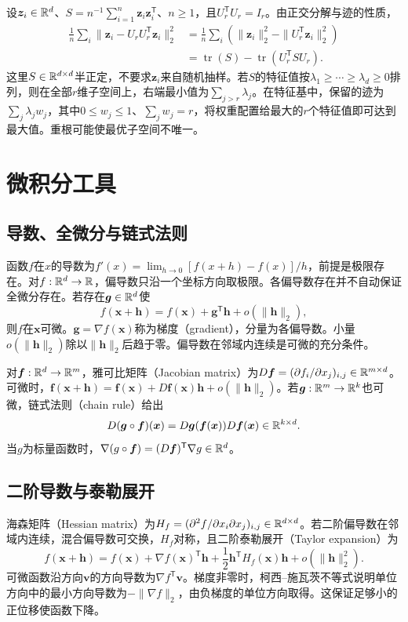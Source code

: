 设$\bm z_i\in\mathbb{R}^d$、$S=n^{-1}\sum_{i=1}^n\bm z_i\bm z_i^{\mathsf T}$、$n\geq1$，且$U_r^{\mathsf T}U_r=I_r$。由正交分解与迹的性质，
\begin{align}
 \frac1n\sum_i\|\bm z_i-U_rU_r^{\mathsf T}\bm z_i\|_2^2
 &=\frac1n\sum_i(\|\bm z_i\|_2^2-\|U_r^{\mathsf T}\bm z_i\|_2^2)\\
 &=\operatorname{tr}(S)-\operatorname{tr}(U_r^{\mathsf T}SU_r).
 \label{eq:math-pca-reconstruction}
\end{align}
这里$S\in\mathbb{R}^{d\times d}$半正定，不要求$\bm z_i$来自随机抽样。若$S$的特征值按$\lambda_1\geq\cdots\geq\lambda_d\geq0$排列，则在全部$r$维子空间上，右端最小值为$\sum_{j>r}\lambda_j$。在特征基中，保留的迹为$\sum_j\lambda_jw_j$，其中$0\leq w_j\leq1$、$\sum_jw_j=r$，将权重配置给最大的$r$个特征值即可达到最大值。重根可能使最优子空间不唯一。

\section{微积分工具}
\subsection{导数、全微分与链式法则}
函数$f$在$x$的导数为$f'(x)=\lim_{h\to0}[f(x+h)-f(x)]/h$，前提是极限存在。对$f:\mathbb{R}^d\to\mathbb{R}$，偏导数只沿一个坐标方向取极限。各偏导数存在并不自动保证全微分存在。若存在$\bm g\in\mathbb{R}^d$使
\begin{equation}
 f(\bm x+\bm h)=f(\bm x)+\bm g^{\mathsf T}\bm h+o(\|\bm h\|_2),
\end{equation}
则$f$在$\bm x$可微。$\bm g=\nabla f(\bm x)$称为梯度（gradient），分量为各偏导数。小量$o(\|\bm h\|_2)$除以$\|\bm h\|_2$后趋于零。偏导数在邻域内连续是可微的充分条件。

对$\bm f:\mathbb{R}^d\to\mathbb{R}^m$，雅可比矩阵（Jacobian matrix）为$D\bm f=(\partial f_i/\partial x_j)_{i,j}\in\mathbb{R}^{m\times d}$。可微时，$\bm f(\bm x+\bm h)=\bm f(\bm x)+D\bm f(\bm x)\bm h+o(\|\bm h\|_2)$。若$\bm g:\mathbb{R}^m\to\mathbb{R}^k$也可微，链式法则（chain rule）给出
\begin{equation}
 D(\bm g\circ\bm f)(\bm x)=D\bm g(\bm f(\bm x))D\bm f(\bm x)\in\mathbb{R}^{k\times d}.
\end{equation}
当$g$为标量函数时，$\nabla(g\circ\bm f)=(D\bm f)^{\mathsf T}\nabla g\in\mathbb{R}^d$。

\subsection{二阶导数与泰勒展开}
海森矩阵（Hessian matrix）为$H_f=(\partial^2 f/\partial x_i\partial x_j)_{i,j}\in\mathbb{R}^{d\times d}$。若二阶偏导数在邻域内连续，混合偏导数可交换，$H_f$对称，且二阶泰勒展开（Taylor expansion）为
\begin{equation}
 f(\bm x+\bm h)=f(\bm x)+\nabla f(\bm x)^{\mathsf T}\bm h
 +\frac12\bm h^{\mathsf T}H_f(\bm x)\bm h+o(\|\bm h\|_2^2).
\end{equation}
可微函数沿方向$\bm v$的方向导数为$\nabla f^{\mathsf T}\bm v$。梯度非零时，柯西--施瓦茨不等式说明单位方向中的最小方向导数为$-\|\nabla f\|_2$，由负梯度的单位方向取得。这保证足够小的正位移使函数下降。

